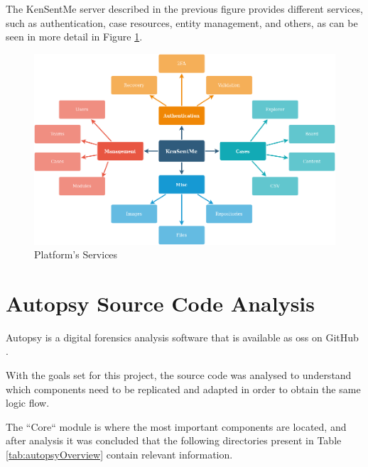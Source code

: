 The KenSentMe server described in the previous figure provides different services, such as authentication, case resources, entity management, and others, as can be seen in more detail in Figure \ref{fig:services}.

\begin{figure}[ht]
 \centering
 \includegraphics[width=1\linewidth]{imgs/services.png}
 \caption{Platform's Services}
 \label{fig:services}
\end{figure}

\section{Autopsy Source Code Analysis}

Autopsy is a digital forensics analysis software that is available as \acrfull{oss} \cite{opensource} on GitHub \cite{github}.

With the goals set for this project, the source code was analysed to understand which components need to be replicated and adapted in order to obtain the same logic flow.

The ``Core`` module \cite{core} is where the most important components are located, and after analysis it was concluded that the following directories present in Table \ref{tab:autopsyOverview} contain relevant information.


\pagebreak

